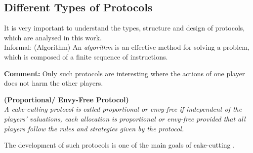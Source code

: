 \subsection{Different Types of Protocols}
It is very important to understand the types, structure and design of protocols, which are analysed in this work.\\
\newline
Informal: (Algorithm)
\newline An \emph{algorithm} is an effective method for solving a problem, which is composed of a finite sequence of instructions.
\textbf{Comment:} Only such protocols are interesting where the actions of one player does not harm the other players.
\begin{defi}{\textbf{(Proportional/ Envy-Free Protocol)}}\\
\emph{A cake-cutting \emph{protocol} is called \emph{proportional} or \emph{envy-free} if independent of the players' valuations, each allocation is proportional or envy-free provided that all players follow the rules and strategies given by the protocol.}
\end{defi}
The development of such protocols is one of the main goals of cake-cutting \cite{robertson:cake-cutting}.

